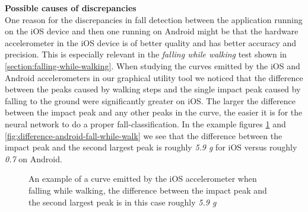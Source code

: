 \documentclass[12pt, a4paper, onecolumn]{article}
\newcommand{\parag}[1]{
	\textbf{#1} \hspace{0pt} \\
}
\begin{document}
	
	\parag{Possible causes of discrepancies}
	One reason for the discrepancies in fall detection between the application running on the iOS device and then one running on Android might be that the hardware accelerometer in the iOS device is of better quality and has better accuracy and precision. This is especially relevant in the \textit{falling while walking} test shown in \ref{section:falling-while-walking}. When studying the curves emitted by the iOS and Android accelerometers in our graphical utility tool we noticed that the difference between the peaks caused by walking steps and the single impact peak caused by falling to the ground were significantly greater on iOS. The larger the difference between the impact peak and any other peaks in the curve, the easier it is for the neural network to do a proper fall-classification. In the example figures \ref{fig:difference-ios-fall-while-walk} and \ref{fig:difference-android-fall-while-walk} we see that the difference between the impact peak and the second largest peak is roughly \textit{5.9 g} for iOS versus  roughly \textit{0.7}  on Android. 
	
	\begin{figure}[H]
		
		\centering
		
		\caption{An example of a curve emitted by the iOS accelerometer when falling while walking, the difference between the impact peak and the second largest peak is in this case roughly \textit{5.9 g}}%
		\label{fig:difference-ios-fall-while-walk}%
	\end{figure}
	
\end{document}
